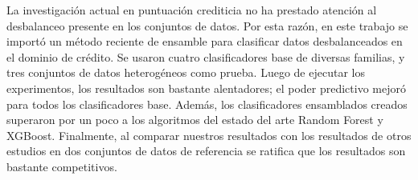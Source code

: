 \begin{resumen}
La investigación actual en puntuación crediticia no ha prestado atención al desbalanceo presente en los conjuntos de datos. Por esta razón, en este trabajo se importó un método reciente de ensamble para clasificar datos desbalanceados en el dominio de crédito. Se usaron cuatro clasificadores base de diversas familias, y tres conjuntos de datos heterogéneos como prueba. Luego de ejecutar los experimentos, los resultados son bastante alentadores; el poder predictivo mejoró para todos los clasificadores base. Además, los clasificadores ensamblados creados superaron por un poco a los algoritmos del estado del arte Random Forest y XGBoost. Finalmente, al comparar nuestros resultados con los resultados de otros estudios en dos conjuntos de datos de referencia se ratifica que los resultados son bastante competitivos.
\end{resumen}

